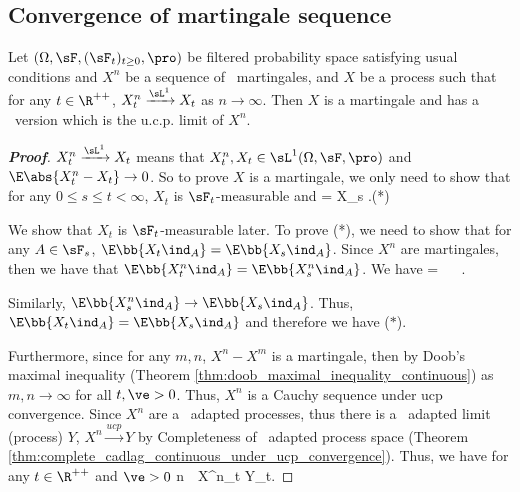 \subsection{Convergence of martingale sequence}

\begin{theorem}\label{thm:convergence_ucp_cadlag_martingale}
Let $(\Omega,\sF,(\sF_t)_{t\geq 0},\pro)$ be filtered probability space satisfying usual conditions and $X^n$ be a sequence of \cadlag\ martingales, and $X$ be a process such that for any $t\in \R^{++}$, $X^n_t \xrightarrow{\sL^1} X_t$ as $n\to \infty$. Then $X$ is a martingale and has a \cadlag\ version which is the u.c.p. limit of $X^n$.
\end{theorem}

\begin{proof}[\bf Proof]%
$X^n_t \xrightarrow{\sL^1} X_t$ means that $X^n_t,X_t \in \sL^1(\Omega,\sF,\pro)$ and $\E\abs{X^n_t - X_t} \to 0$. So to prove $X$ is a martingale, we only need to show that for any $0\leq s\leq t < \infty$, $X_t$ is $\sF_t$-measurable and
\be
\E{} = X_s .\qquad (*)
\ee

We show that $X_t$ is $\sF_t$-measurable later. To prove (*), we need to show that for any $A\in \sF_s$, $\E\bb{X_t\ind_A} = \E\bb{X_s\ind_A}$. Since $X^n$ are martingales, then we have that $\E\bb{X^n_t\ind_A} = \E\bb{X^n_s\ind_A}$. We have
\be
{} =  \leq \E{} \leq \E{}  \ \ra \ \E{} \to \E{}.
\ee

Similarly, $\E\bb{X^n_s\ind_A} \to \E\bb{X_s\ind_A}$. Thus, $\E\bb{X_t\ind_A} = \E\bb{X_s\ind_A}$ and therefore we have ($*$).

Furthermore, since for any $m,n$, $X^n-X^m$ is a martingale, then by Doob's maximal inequality (Theorem \ref{thm:doob_maximal_inequality_continuous})
\be
\pro{} \leq {} \E{} \leq {}  
\ee
as $m,n\to \infty$ for all $t,\ve>0$. Thus, $X^n$ is a Cauchy sequence under ucp convergence. Since $X^n$ are a \cadlag\ adapted processes, thus there is a \cadlag\ adapted limit (process) $Y$, $X^n \xrightarrow{ucp} Y$ by Completeness of \cadlag\ adapted process space (Theorem \ref{thm:complete_cadlag_continuous_under_ucp_convergence}). Thus, we have for any $t\in \R^{++}$ and $\ve >0$
\be
\pro{} \leq \pro{} \quad {}n\to \infty \ \ra \ X^n_t  Y_t.
\ee


\end{proof}
